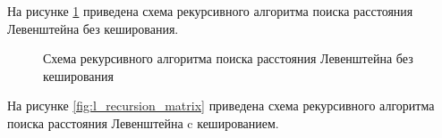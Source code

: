 \newpage
На рисунке \ref{fig:l_recursion_classic} приведена схема рекурсивного алгоритма поиска расстояния Левенштейна без кеширования.

\begin{figure}[h!]
	
		
	\caption{Схема рекурсивного алгоритма поиска расстояния Левенштейна без кеширования}
		
	\label{fig:l_recursion_classic}
		
\end{figure}

\newpage
На рисунке \ref{fig:l_recursion_matrix} приведена схема рекурсивного алгоритма поиска расстояния Левенштейна c кешированием.



